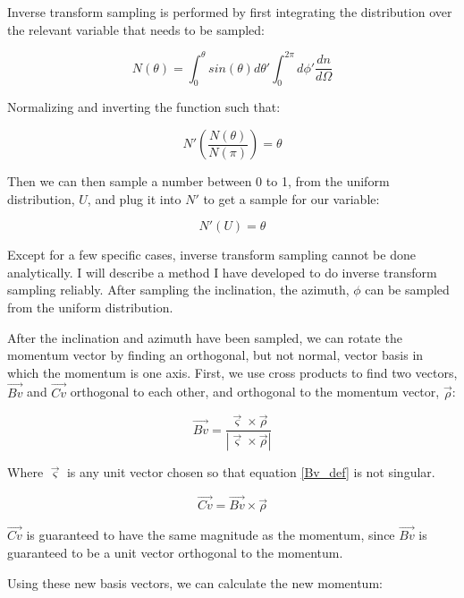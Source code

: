 \documentclass[]{article}
\begin{document}
Inverse transform sampling is performed by first integrating the distribution over the relevant variable that needs to be sampled:

\begin{equation}
N(\theta) = \int_0^{\theta} sin(\theta ) d\theta '  \int_0^{2\pi} d\phi ' \frac{dn}{d\Omega}
\end{equation}

Normalizing and inverting the function such that:

\begin{equation}
N'\left(  \frac{N(\theta)}{N(\pi)}  \right) = \theta
\end{equation}

Then we can then sample a number between 0 to 1, from the uniform distribution, $U$, and plug it into $N'$ to get a sample for our variable:

\begin{equation}
N'\left(  U  \right) = \theta
\end{equation}

Except for a few specific cases, inverse transform sampling cannot be done analytically. I will describe a method I have developed to do inverse transform sampling reliably. After sampling the inclination, the azimuth, $\phi$ can be sampled from the uniform distribution. 

After the inclination and azimuth have been sampled, we can rotate the momentum vector by finding an orthogonal, but not normal, vector basis in which the momentum is one axis. First, we use cross products to find two vectors, $\vec{Bv}$ and $\vec{Cv}$ orthogonal to each other, and orthogonal to the momentum vector, $\vec{\rho}$:

\begin{equation}
\label{Bv_def}
\vec{Bv}=\frac{\vec{\varsigma}\times \vec{\rho}}{ \left| \vec{\varsigma}\times \vec{\rho}  \right|   }
\end{equation}

Where $\vec{\varsigma}$ is any unit vector chosen so that equation \ref{Bv_def} is not singular.

\begin{equation}
\vec{Cv}=\vec{Bv}\times \vec{\rho}
\end{equation}

$\vec{Cv}$ is guaranteed to have the same magnitude as the momentum, since $\vec{Bv}$ is guaranteed to be a unit vector orthogonal to the momentum.

Using these new basis vectors, we can calculate the new momentum:
\end{document}
